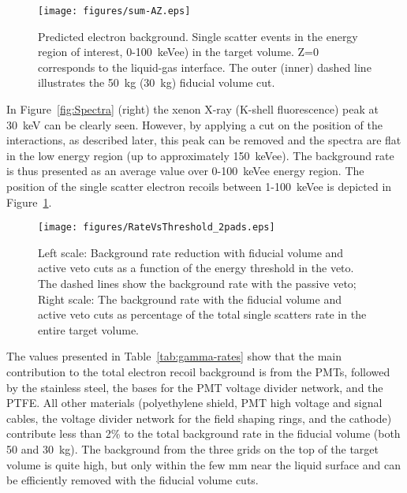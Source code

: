 \begin{figure}[t!]
\begin{center}
 \texttt{[image: figures/sum-AZ.eps]}
\caption{Predicted electron background. Single scatter events in the energy region of interest, 0-100~keVee) in the target volume. Z=0 corresponds to
the liquid-gas interface. The outer (inner) dashed line 
illustrates the 50~kg (30~kg) fiducial volume cut.}
\label{fig:HitsDistribution}
\end{center}
\end{figure}

In Figure~\ref{fig:Spectra} (right) the xenon X-ray (K-shell fluorescence) peak at 30~keV can be clearly
seen. However, by applying a cut on the position of the interactions, as
described later, this peak can be  removed and the spectra are 
flat in the low energy region (up to approximately 150~keVee). The 
background rate is thus presented as an average value over 0-100~keVee energy region.
The position of the single scatter electron recoils between 1-100~keVee is depicted 
in Figure~\ref{fig:HitsDistribution}.

\begin{figure}[!h]
\begin{center}
\texttt{[image: figures/RateVsThreshold\_2pads.eps]}
\caption{Left scale: Background rate reduction with fiducial volume and active veto cuts
  as a function of the energy threshold in the veto. The dashed lines show the
  background rate with the passive veto; Right scale: The background
 rate with the fiducial volume and active veto cuts as percentage of the total single scatters rate in the entire target volume.}
\label{fig:VetoCuts}
\end{center}
\end{figure}

The values presented in Table~\ref{tab:gamma-rates} show that the main
contribution to the total electron recoil background is 
from the PMTs, followed by the stainless steel, the bases for the PMT 
voltage divider network, and the PTFE. All other materials (polyethylene shield, PMT high
voltage and signal cables, the voltage divider network for the field shaping
rings, and the cathode) contribute less than 2\% to the total background rate in the fiducial volume (both 50 and 30~kg). 
The background from the three grids on the top of the target volume is quite high,
but only within the few mm near the liquid surface and can be efficiently removed with the fiducial volume cuts.

